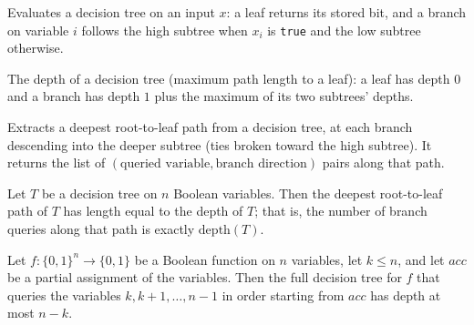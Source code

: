 \begin{definition}
\label{DecisionTree.eval}
\leanok
{}
Evaluates a decision tree on an input $x$: a leaf returns its stored bit, and a branch
on variable $i$ follows the high subtree when $x_i$ is \texttt{true} and the low subtree
otherwise.
\end{definition}

\begin{definition}
\label{DecisionTree.depth}
\leanok
{}
The depth of a decision tree (maximum path length to a leaf): a leaf has depth $0$ and a
branch has depth $1$ plus the maximum of its two subtrees' depths.
\end{definition}

\begin{definition}
\label{DecisionTree.deepPath}
\leanok
{}
Extracts a deepest root-to-leaf path from a decision tree, at each branch descending into
the deeper subtree (ties broken toward the high subtree). It returns the list of
$(\text{queried variable}, \text{branch direction})$ pairs along that path.
\end{definition}

\begin{lemma}
\label{DecisionTree.length_deepPath}
\leanok
{}
Let $T$ be a decision tree on $n$ Boolean variables. Then the deepest root-to-leaf path
of $T$ has length equal to the depth of $T$; that is, the number of branch queries along
that path is exactly $\mathrm{depth}(T)$.
\end{lemma}

\begin{lemma}
\label{DecisionTree.buildFull_depth}
\leanok
{}
Let $f\colon\{0,1\}^n \to \{0,1\}$ be a Boolean function on $n$ variables, let $k \le
n$, and let $acc$ be a partial assignment of the variables. Then the full decision tree
for $f$ that queries the variables $k, k+1, \dots, n-1$ in order starting from $acc$ has
depth at most $n - k$.
\end{lemma}

